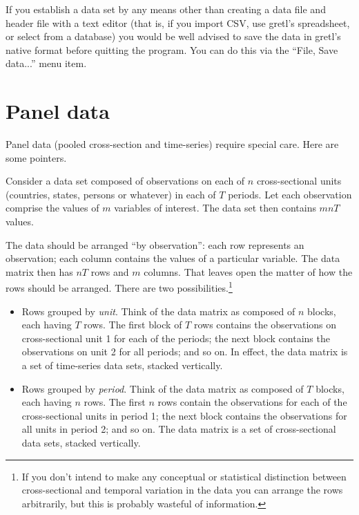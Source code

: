 \documentclass{article}
\begin{document}
If you establish a data set by any means other than creating a data
file and header file with a text editor (that is,
if you import CSV, use \textsf{gretl}'s spreadsheet, or select from a
database) you would be well advised to save the data in
\textsf{gretl}'s native format before quitting the program.  You can
do this via the ``File, Save data...'' menu item.

\section{Panel data}
\label{panel}

Panel data (pooled cross-section and time-series) require special
care.  Here are some pointers.

Consider a data set composed of observations on each of $n$
cross-sectional units (countries, states, persons or whatever) in each
of $T$ periods.  Let each observation comprise the values of $m$
variables of interest.  The data set then contains $mnT$ values.

The data should be arranged ``by observation'': each row represents an
observation; each column contains the values of a particular variable.
The data matrix then has $nT$ rows and $m$ columns.  That leaves open
the matter of how the rows should be arranged.  There are two
possibilities.\footnote{If you don't intend to make any conceptual or
  statistical distinction between cross-sectional and temporal
  variation in the data you can arrange the rows arbitrarily, but
  this is probably wasteful of information.}

\begin{itemize}
\item Rows grouped by \textit{unit}.  Think of the data matrix as
  composed of $n$ blocks, each having $T$ rows.  The first block of
  $T$ rows contains the observations on cross-sectional unit 1 for each
  of the periods; the next block contains the observations on unit 2
  for all periods; and so on.  In effect, the data matrix is a set of
  time-series data sets, stacked vertically.
\item Rows grouped by \textit{period}.  Think of the data matrix as
  composed of $T$ blocks, each having $n$ rows.  The first $n$ rows
  contain the observations for each of the cross-sectional units in
  period 1; the next block contains the observations for all units in
  period 2; and so on.  The data matrix is a set of cross-sectional
  data sets, stacked vertically.
\end{itemize}
\end{document}
